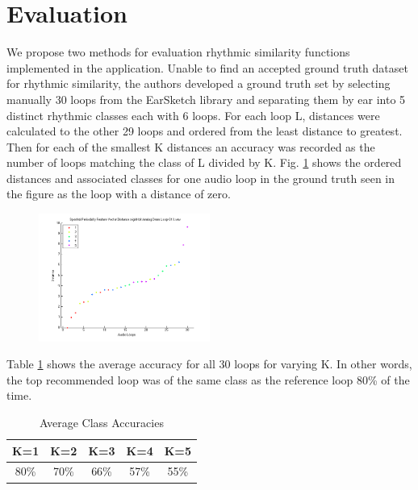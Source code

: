 \documentclass{article}
\begin{document}
\section{Evaluation}
We propose two methods for evaluation rhythmic similarity functions implemented in the application. Unable to find an accepted ground truth dataset for rhythmic similarity, the authors developed a ground truth set by selecting manually 30 loops from the EarSketch library and separating them by ear into 5 distinct rhythmic classes each with 6 loops. For each loop L, distances were calculated to the other 29 loops and ordered from the least distance to greatest. Then for each of the smallest K distances an accuracy was recorded as the number of loops matching the class of L divided by K. Fig. \ref{fig:eval1_dist} shows the ordered distances and associated classes for one audio loop in the ground truth seen in the figure as the loop with a distance of zero.

\begin{figure}[h!]
  \centering
   \centerline{\includegraphics[width=0.5\textwidth]{distance_graph_eval1.png}}
      \caption{}\label{fig:eval1_dist}
\end{figure}

Table \ref{tab:bs_eval} shows the average accuracy for all 30 loops for varying K. In other words, the top recommended loop was of the same class as the reference loop 80\% of the time.

\begin{table}[h!]
  \begin{center}
    \begin{tabular}{| c | c | c | c | c |}
    \hline
    K=1 & K=2 & K=3 & K=4 & K=5 \\
    \hline
    80\% & 70\% & 66\%  & 57\% & 55\% \\
    \hline
    \end{tabular}
  \end{center}
  \caption{Average Class Accuracies}\label{tab:bs_eval}
\end{table}
\end{document}
